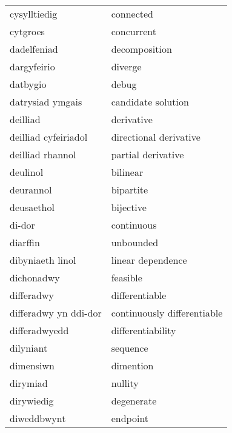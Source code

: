 \begin{supertabular}{p{0.22\textwidth}p{0.22\textwidth}}
                    cysylltiedig &                         connected \\
                        cytgroes &                        concurrent \\
                     dadelfeniad &                     decomposition \\
                     dargyfeirio &                           diverge \\
                        datbygio &                             debug \\
                datrysiad ymgais &                candidate solution \\
                        deilliad &                        derivative \\
            deilliad cyfeiriadol &            directional derivative \\
                deilliad rhannol &                partial derivative \\
                        deulinol &                          bilinear \\
                       deurannol &                         bipartite \\
                      deusaethol &                         bijective \\
                          di-dor &                        continuous \\
                        diarffin &                         unbounded \\
                dibyniaeth linol &                 linear dependence \\
                      dichonadwy &                          feasible \\
                      differadwy &                    differentiable \\
           differadwy yn ddi-dor &       continuously differentiable \\
                   differadwyedd &                 differentiability \\
                       dilyniant &                          sequence \\
                       dimensiwn &                         dimention \\
                        dirymiad &                           nullity \\
                      dirywiedig &                        degenerate \\
                     diweddbwynt &                          endpoint \\

\end{supertabular}

